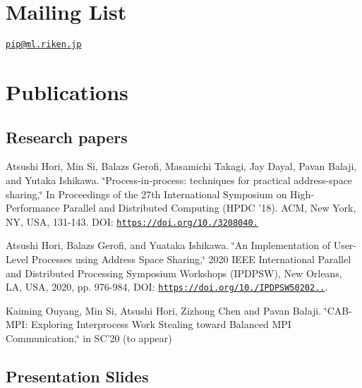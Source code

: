 \section*{Mailing List}

\href{mailto:pip@ml.riken.jp}{\tt pip@ml.\-riken.\-jp}

\section*{Publications}

\subsection*{Research papers}

Atsushi Hori, Min Si, Balazs Gerofi, Masamichi Takagi, Jay Dayal, Pavan Balaji, and Yutaka Ishikawa. \char`\"{}\-Process-\/in-\/process\-: techniques for
practical address-\/space sharing,\char`\"{} In Proceedings of the 27th International Symposium on High-\/\-Performance Parallel and Distributed Computing (H\-P\-D\-C '18). A\-C\-M, New York, N\-Y, U\-S\-A, 131-\/143. D\-O\-I\-: \href{https://doi.org/10.1145/3208040.3208045}{\tt https\-://doi.\-org/10./3208040.}

Atsushi Hori, Balazs Gerofi, and Yuataka Ishikawa. \char`\"{}\-An Implementation
of User-\/\-Level Processes using Address Space Sharing,\char`\"{} 2020 I\-E\-E\-E International Parallel and Distributed Processing Symposium Workshops (I\-P\-D\-P\-S\-W), New Orleans, L\-A, U\-S\-A, 2020, pp. 976-\/984, D\-O\-I\-: \href{https://doi.org/10.1109/IPDPSW50202.2020.00161}{\tt https\-://doi.\-org/10./\-I\-P\-D\-P\-S\-W50202..}.

Kaiming Ouyang, Min Si, Atsushi Hori, Zizhong Chen and Pavan Balaji. \char`\"{}\-C\-A\-B-\/\-M\-P\-I\-: Exploring Interprocess Work Stealing toward Balanced
\-M\-P\-I Communication,\char`\"{} in S\-C’20 (to appear)

\subsection*{Presentation Slides}


